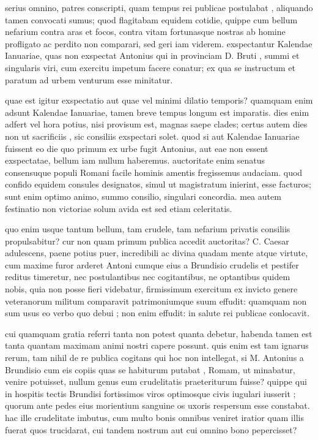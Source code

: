 
 serius omnino, patres conscripti, quam tempus rei publicae postulabat , aliquando tamen convocati sumus; quod flagitabam equidem cotidie, quippe cum bellum nefarium contra aras et focos, contra vitam fortunasque nostras ab homine profligato ac perdito non comparari, sed geri iam viderem. exspectantur Kalendae Ianuariae, quas non exspectat Antonius qui in provinciam D. Bruti , summi et singularis viri, cum exercitu impetum facere conatur; ex qua se instructum et paratum ad urbem venturum esse minitatur.

 quae est igitur exspectatio aut quae vel minimi dilatio temporis? quamquam enim adsunt Kalendae Ianuariae, tamen breve tempus longum est imparatis. dies enim adfert vel hora potius, nisi provisum est, magnas saepe clades; certus autem dies non ut sacrificiis , sic consiliis exspectari solet. quod si aut Kalendae Ianuariae fuissent eo die quo primum ex urbe fugit Antonius, aut eae non essent exspectatae, bellum iam nullum haberemus. auctoritate enim senatus consensuque populi Romani facile hominis amentis fregissemus audaciam. quod confido equidem consules designatos, simul ut magistratum inierint, esse facturos; sunt enim optimo animo, summo consilio, singulari concordia. mea autem festinatio non victoriae solum avida est sed etiam celeritatis.

 quo enim usque tantum bellum, tam crudele, tam nefarium privatis consiliis propulsabitur? cur non quam primum publica accedit auctoritas? C. Caesar adulescens, paene potius puer, incredibili ac divina quadam mente atque virtute, cum maxime furor arderet Antoni cumque eius a Brundisio crudelis et pestifer reditus timeretur, nec postulantibus nec cogitantibus, ne optantibus quidem nobis, quia non posse fieri videbatur, firmissimum exercitum ex invicto genere veteranorum militum comparavit patrimoniumque suum effudit: quamquam non sum usus eo verbo quo debui ; non enim effudit: in salute rei publicae conlocavit.

 cui quamquam gratia referri tanta non potest quanta debetur, habenda tamen est tanta quantam maximam animi nostri capere possunt. quis enim est tam ignarus rerum, tam nihil de re publica cogitans qui hoc non intellegat, si M. Antonius a Brundisio cum eis copiis quas se habiturum putabat , Romam, ut minabatur, venire potuisset, nullum genus eum crudelitatis praeteriturum fuisse? quippe qui in hospitis tectis Brundisi fortissimos viros optimosque civis iugulari iusserit ; quorum ante pedes eius morientium sanguine os uxoris respersum esse constabat. hac ille crudelitate imbutus, cum multo bonis omnibus veniret iratior quam illis fuerat quos trucidarat, cui tandem nostrum aut cui omnino bono pepercisset?

